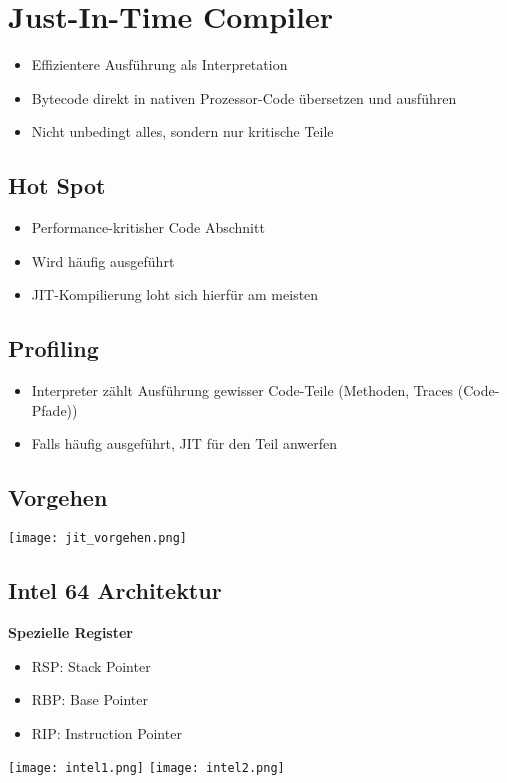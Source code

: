 \section{Just-In-Time Compiler}
\begin{itemize}
    \item Effizientere Ausführung als Interpretation
    \item Bytecode direkt in nativen Prozessor-Code übersetzen und ausführen
    \item Nicht unbedingt alles, sondern nur kritische Teile
\end{itemize}

\subsection{Hot Spot}
\begin{itemize}
    \item Performance-kritisher Code Abschnitt
    \item Wird häufig ausgeführt
    \item JIT-Kompilierung loht sich hierfür am meisten
\end{itemize}

\subsection{Profiling}
\begin{itemize}
    \item Interpreter zählt Ausführung gewisser Code-Teile (Methoden, Traces (Code-Pfade))
    \item Falls häufig ausgeführt, JIT für den Teil anwerfen
\end{itemize}

\subsection{Vorgehen}
\texttt{[image: jit\_vorgehen.png]}

\subsection{Intel 64 Architektur}
\textbf{Spezielle Register}
\begin{itemize}
    \item RSP: Stack Pointer
    \item RBP: Base Pointer
    \item RIP: Instruction Pointer
\end{itemize}
\texttt{[image: intel1.png]}
\texttt{[image: intel2.png]}

